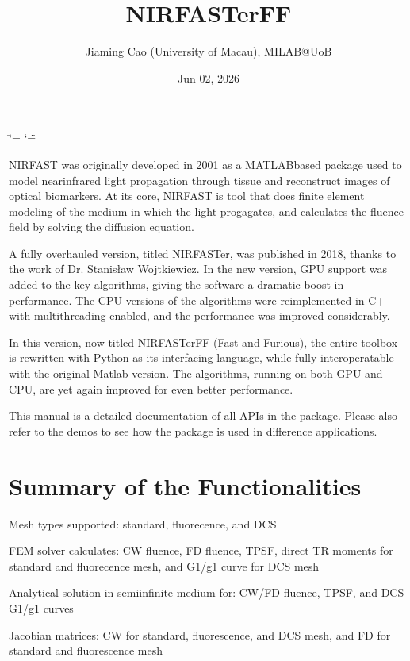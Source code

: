 \documentclass[letterpaper,10pt,english]{sphinxmanual}
\title{NIRFASTerFF}
\date{Jun 02, 2026}
\author{Jiaming Cao (University of Macau), MILAB@UoB}
\begin{document}
\ifdefined\shorthandoff
  \ifnum\catcode`\=\string=\active\shorthandoff{=}\fi
  \ifnum\catcode`\"=\active{}\fi
\fi

\pagestyle{empty}
\sphinxmaketitle
\pagestyle{plain}
\sphinxtableofcontents
\pagestyle{normal}
\label{\detokenize{index::doc}}


\sphinxAtStartPar
NIRFAST was originally developed in 2001 as a MATLAB\sphinxhyphen{}based package used to model near\sphinxhyphen{}infrared light propagation through tissue and reconstruct images of optical biomarkers. At its core, NIRFAST is tool that does finite element modeling of the medium in which the light progagates, and calculates the fluence field by solving the diffusion equation.

\sphinxAtStartPar
A fully overhauled version, titled NIRFASTer, was published in 2018, thanks to the work of Dr. Stanisław Wojtkiewicz. In the new version, GPU support was added to the key algorithms, giving the software a dramatic boost in performance. The CPU versions of the algorithms were re\sphinxhyphen{}implemented in C++ with multithreading enabled, and the performance was improved considerably.

\sphinxAtStartPar
In this version, now titled NIRFASTerFF (Fast and Furious), the entire toolbox is re\sphinxhyphen{}written with Python as its interfacing language, while fully inter\sphinxhyphen{}operatable with the original Matlab version. The algorithms, running on both GPU and CPU, are yet again improved for even better performance.

\sphinxAtStartPar
This manual is a detailed documentation of all APIs in the package. Please also refer to the demos to see how the package is used in difference applications.


\chapter{Summary of the Functionalities}
\label{\detokenize{index:summary-of-the-functionalities}}
\sphinxAtStartPar
Mesh types supported: standard, fluorecence, and DCS

\sphinxAtStartPar
FEM solver calculates: CW fluence, FD fluence, TPSF, direct TR moments for standard and fluorecence mesh, and G1/g1 curve for DCS mesh

\sphinxAtStartPar
Analytical solution in semi\sphinxhyphen{}infinite medium for: CW/FD fluence, TPSF, and DCS G1/g1 curves

\sphinxAtStartPar
Jacobian matrices: CW for standard, fluorescence, and DCS mesh, and FD for standard and fluorescence mesh
\end{document}
